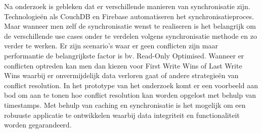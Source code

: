 Na onderzoek is gebleken dat er verschillende manieren van synchronisatie zijn. Technologie\"en als CouchDB en Firebase automatiseren het synchronisatieproces. Maar wanneer men zelf de synchronisatie wenst te realiseren is het belangrijk om de verschillende use cases onder te verdelen volgens synchronisatie methode en zo verder te werken. Er zijn scenario's waar er geen conflicten zijn maar performantie de belangrijkste factor is bv. Read-Only Optimised. Wanneer er conflicten optreden kan men dan kiezen voor First Write Wins of Last Write Wins waarbij er onvermijdelijk data verloren gaat of andere strategie\"en van conflict resolution. In het prototype van het onderzoek komt er een voorbeeld aan bod om aan te tonen hoe conflict resolution kan worden opgelost met behulp van timestamps. Met behulp van caching en synchronisatie is het mogelijk om een robuuste applicatie te ontwikkelen waarbij data integriteit en functionaliteit worden gegarandeerd.